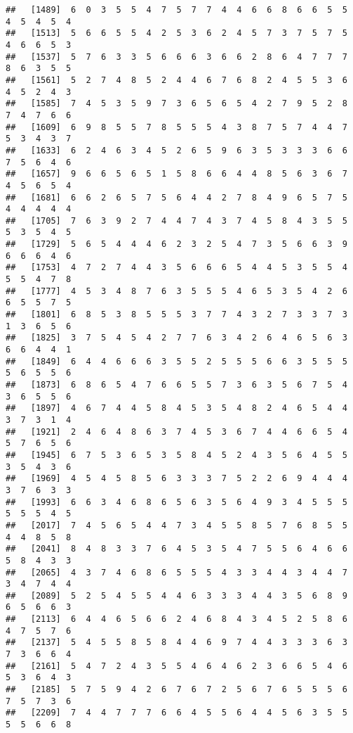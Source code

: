 \documentclass[
]{book}
\begin{document}
\begin{verbatim}
##   [1489]  6  0  3  5  5  4  7  5  7  7  4  4  6  6  8  6  6  5  5  4  5  4  5  4
##   [1513]  5  6  6  5  5  4  2  5  3  6  2  4  5  7  3  7  5  7  5  4  6  6  5  3
##   [1537]  5  7  6  3  3  5  6  6  6  3  6  6  2  8  6  4  7  7  7  8  6  3  5  5
##   [1561]  5  2  7  4  8  5  2  4  4  6  7  6  8  2  4  5  5  3  6  4  5  2  4  3
##   [1585]  7  4  5  3  5  9  7  3  6  5  6  5  4  2  7  9  5  2  8  7  4  7  6  6
##   [1609]  6  9  8  5  5  7  8  5  5  5  4  3  8  7  5  7  4  4  7  5  3  4  3  7
##   [1633]  6  2  4  6  3  4  5  2  6  5  9  6  3  5  3  3  3  6  6  7  5  6  4  6
##   [1657]  9  6  6  5  6  5  1  5  8  6  6  4  4  8  5  6  3  6  7  4  5  6  5  4
##   [1681]  6  6  2  6  5  7  5  6  4  4  2  7  8  4  9  6  5  7  5  4  4  4  4  4
##   [1705]  7  6  3  9  2  7  4  4  7  4  3  7  4  5  8  4  3  5  5  5  3  5  4  5
##   [1729]  5  6  5  4  4  4  6  2  3  2  5  4  7  3  5  6  6  3  9  6  6  6  4  6
##   [1753]  4  7  2  7  4  4  3  5  6  6  6  5  4  4  5  3  5  5  4  5  5  4  7  8
##   [1777]  4  5  3  4  8  7  6  3  5  5  5  4  6  5  3  5  4  2  6  6  5  5  7  5
##   [1801]  6  8  5  3  8  5  5  5  3  7  7  4  3  2  7  3  3  7  3  1  3  6  5  6
##   [1825]  3  7  5  4  5  4  2  7  7  6  3  4  2  6  4  6  5  6  3  6  6  4  4  1
##   [1849]  6  4  4  6  6  6  3  5  5  2  5  5  5  6  6  3  5  5  5  5  6  5  5  6
##   [1873]  6  8  6  5  4  7  6  6  5  5  7  3  6  3  5  6  7  5  4  3  6  5  5  6
##   [1897]  4  6  7  4  4  5  8  4  5  3  5  4  8  2  4  6  5  4  4  3  7  3  1  4
##   [1921]  2  4  6  4  8  6  3  7  4  5  3  6  7  4  4  6  6  5  4  5  7  6  5  6
##   [1945]  6  7  5  3  6  5  3  5  8  4  5  2  4  3  5  6  4  5  5  3  5  4  3  6
##   [1969]  4  5  4  5  8  5  6  3  3  3  7  5  2  2  6  9  4  4  4  3  7  6  3  3
##   [1993]  6  6  3  4  6  8  6  5  6  3  5  6  4  9  3  4  5  5  5  5  5  5  4  5
##   [2017]  7  4  5  6  5  4  4  7  3  4  5  5  8  5  7  6  8  5  5  4  4  8  5  8
##   [2041]  8  4  8  3  3  7  6  4  5  3  5  4  7  5  5  6  4  6  6  5  8  4  3  3
##   [2065]  4  3  7  4  6  8  6  5  5  5  4  3  3  4  4  3  4  4  7  3  4  7  4  4
##   [2089]  5  2  5  4  5  5  4  4  6  3  3  3  4  4  3  5  6  8  9  6  5  6  6  3
##   [2113]  6  4  4  6  5  6  6  2  4  6  8  4  3  4  5  2  5  8  6  4  7  5  7  6
##   [2137]  5  4  5  5  8  5  8  4  4  6  9  7  4  4  3  3  3  6  3  7  3  6  6  4
##   [2161]  5  4  7  2  4  3  5  5  4  6  4  6  2  3  6  6  5  4  6  5  3  6  4  3
##   [2185]  5  7  5  9  4  2  6  7  6  7  2  5  6  7  6  5  5  5  6  7  5  7  3  6
##   [2209]  7  4  4  7  7  7  6  6  4  5  5  6  4  4  5  6  3  5  5  5  5  6  6  8

\end{verbatim}
\end{document}
